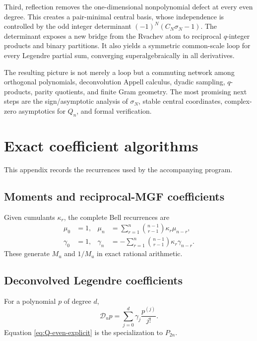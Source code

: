 \documentclass[11pt,oneside]{article}
\numberwithin{equation}{section}
\theoremstyle{definition}
\theoremstyle{remark}
\newcommand{\M}{M_u}
\newcommand{\Dscr}{\mathscr D_u}
\begin{document}
Third, reflection removes the one-dimensional nonpolynomial defect at every
even degree.  This creates a pair-minimal central basis, whose independence is
controlled by the odd integer determinant
$(-1)^N(C_N\sigma_N-1)$.  The determinant exposes a new bridge from the
Rvachev atom to reciprocal $q$-integer products and binary partitions.  It
also yields a symmetric common-scale loop for every Legendre partial sum,
converging superalgebraically in all derivatives.

The resulting picture is not merely a loop but a commuting network among
orthogonal polynomials, deconvolution Appell calculus, dyadic sampling,
$q$-products, parity quotients, and finite Gram geometry.  The most promising
next steps are the sign/asymptotic analysis of $\sigma_N$, stable central
coordinates, complex-zero asymptotics for $Q_n$, and formal verification.

\appendix

\section{Exact coefficient algorithms}
\label{app:algorithms}

This appendix records the recurrences used by the accompanying program.

\subsection{Moments and reciprocal-MGF coefficients}

Given cumulants $\kappa_r$, the complete Bell recurrences are
\begin{align}
 \mu_0&=1,&
 \mu_n&=\sum_{r=1}^{n}\binom{n-1}{r-1}\kappa_r\mu_{n-r},
 \label{eq:mu-recurrence}\\
 \gamma_0&=1,&
 \gamma_n&=-\sum_{r=1}^{n}\binom{n-1}{r-1}\kappa_r\gamma_{n-r}.
 \label{eq:gamma-recurrence}
\end{align}
These generate $\M$ and $1/\M$ in exact rational arithmetic.

\subsection{Deconvolved Legendre coefficients}

For a polynomial $p$ of degree $d$,
\begin{equation}
 \Dscr p=\sum_{j=0}^{d}\gamma_j\frac{p^{(j)}}{j!}.
 \label{eq:finite-deconv-algorithm}
\end{equation}
Equation \eqref{eq:Q-even-explicit} is the specialization to $P_{2n}$.
\end{document}
